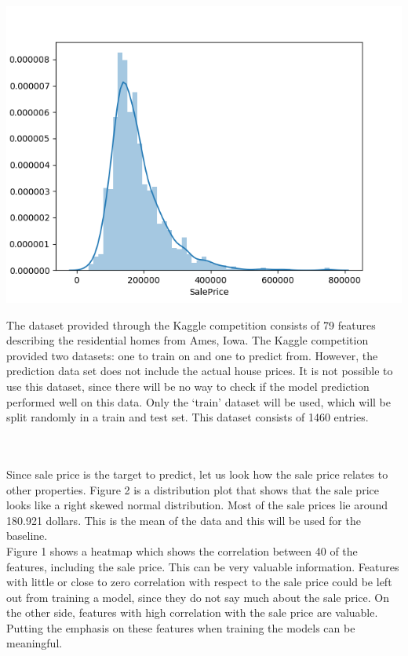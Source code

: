 \documentclass[a4paper,11pt]{article}
\begin{document}
\begin{minipage}{0.6\linewidth}
\includegraphics[width=\linewidth]{images/distribution.png}
\end{minipage}
\begin{minipage}{0.39\linewidth}
The dataset provided through the Kaggle competition consists of 79 features describing the residential homes from Ames, Iowa. The Kaggle competition provided two datasets: one to train on and one to predict from. However, the prediction data set does not include the actual house prices. It is not possible to use this dataset, since there will be no way to check if the model prediction performed well on this data. Only the ‘train’ dataset will be used, which will be split randomly in a train and test set. This dataset consists of 1460 entries.
\end{minipage}
\\
\\
Since sale price is the target to predict, let us look how the sale price relates to other properties. Figure 2 is a distribution plot that shows that the sale price looks like a right skewed normal distribution. Most of the sale prices lie around 180.921 dollars. This is the mean of the data and this will be used for the baseline.\\

Figure 1 shows a heatmap which shows the correlation between 40 of the features, including the sale price. This can be very valuable information. Features with little or close to zero correlation with respect to the sale price could be left out from training a model, since they do not say much about the sale price. On the other side, features with high correlation with the sale price are valuable. Putting the emphasis on these features when training the models can be meaningful. \\
\end{document}
